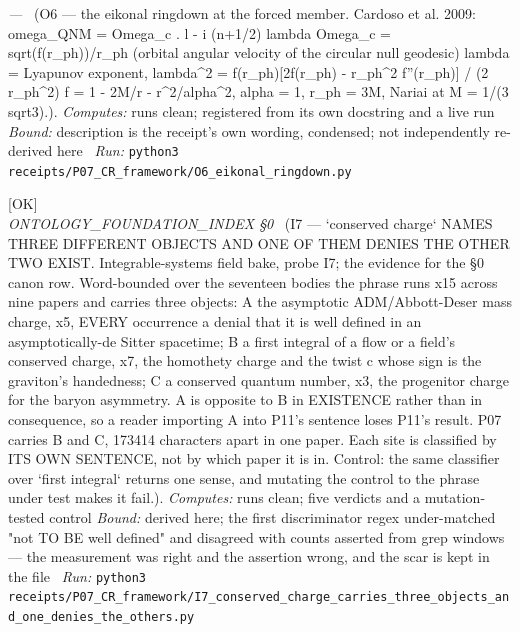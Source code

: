\begin{description}
\textit{---} \ (O6 --- the eikonal ringdown at the forced member. Cardoso et al. 2009: omega\_QNM = Omega\_c . l - i (n+1/2) \textbar{}lambda\textbar{} Omega\_c = sqrt(f(r\_ph))/r\_ph (orbital angular velocity of the circular null geodesic) lambda = Lyapunov exponent, lambda\textasciicircum{}2 = f(r\_ph)[2f(r\_ph) - r\_ph\textasciicircum{}2 f''(r\_ph)] / (2 r\_ph\textasciicircum{}2) f = 1 - 2M/r - r\textasciicircum{}2/alpha\textasciicircum{}2, alpha = 1, r\_ph = 3M, Nariai at M = 1/(3 sqrt3).). 
\emph{Computes:} runs clean; registered from its own docstring and a live run
 \emph{Bound:} description is the receipt's own wording, condensed; not independently re-derived here
\ \emph{Run:} \texttt{python3 receipts/P07\_CR\_framework/O6\_eikonal\_ringdown.py}
\item[\rcptlabel{I7_conserved_charge_carries_three_objects_and_one_denies_the_others}{P7R20}\textbf{P7R20}\quad\texttt{I7\_conserved\_charge\_carries\_three\_objects\_and\_one\_denies\_the\_others}]\hfill\textsf{[OK]}\\
\textit{ONTOLOGY\_FOUNDATION\_INDEX \S{}0} \ (I7 --- `conserved charge` NAMES THREE DIFFERENT OBJECTS AND ONE OF THEM DENIES THE OTHER TWO EXIST. Integrable-systems field bake, probe I7; the evidence for the \S{}0 canon row. Word-bounded over the seventeen bodies the phrase runs x15 across nine papers and carries three objects: A the asymptotic ADM/Abbott-Deser mass charge, x5, EVERY occurrence a denial that it is well defined in an asymptotically-de Sitter spacetime; B a first integral of a flow or a field's conserved charge, x7, the homothety charge and the twist c whose sign is the graviton's handedness; C a conserved quantum number, x3, the progenitor charge for the baryon asymmetry. A is opposite to B in EXISTENCE rather than in consequence, so a reader importing A into P11's sentence loses P11's result. P07 carries B and C, 173414 characters apart in one paper. Each site is classified by ITS OWN SENTENCE, not by which paper it is in. Control: the same classifier over `first integral` returns one sense, and mutating the control to the phrase under test makes it fail.). 
\emph{Computes:} runs clean; five verdicts and a mutation-tested control
 \emph{Bound:} derived here; the first discriminator regex under-matched "not TO BE well defined" and disagreed with counts asserted from grep windows --- the measurement was right and the assertion wrong, and the scar is kept in the file
\ \emph{Run:} \texttt{python3 receipts/P07\_CR\_framework/I7\_conserved\_charge\_carries\_three\_objects\_and\_one\_denies\_the\_others.py}

\end{description}
